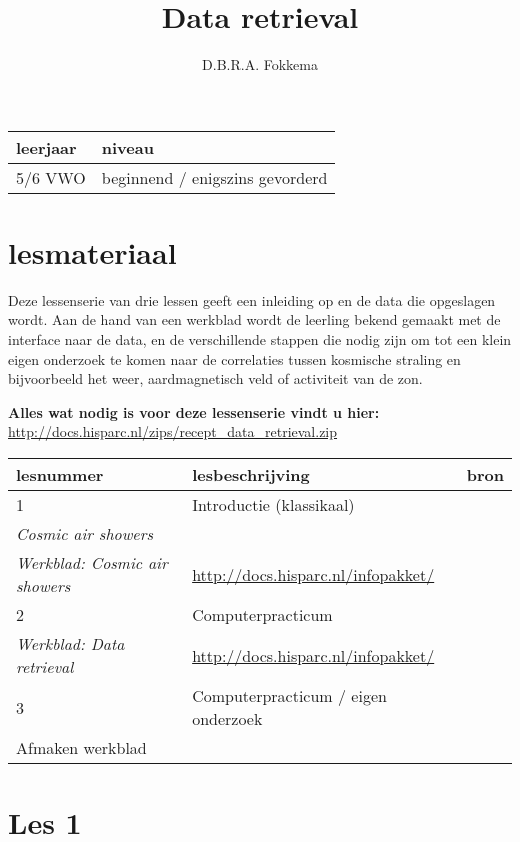 

\title{Data retrieval}
\author{D.B.R.A. Fokkema}



\maketitle

\begin{tabular}{|>{\raggedright}p{3cm}|>{\raggedright}p{12cm}|}
\hline
leerjaar & niveau \tabularnewline
\hline
5/6 VWO & beginnend / enigszins gevorderd \tabularnewline
\hline
\end{tabular}


\section{lesmateriaal}

Deze lessenserie van drie lessen geeft een inleiding op \hisparc en de
data die opgeslagen wordt. Aan de hand van een werkblad wordt de leerling
bekend gemaakt met de interface naar de \hisparc data, en de verschillende
stappen die nodig zijn om tot een klein eigen onderzoek te komen naar de
correlaties tussen kosmische straling en bijvoorbeeld het weer,
aardmagnetisch veld of activiteit van de zon.

\textbf{Alles wat nodig is voor deze lessenserie vindt u hier:}
\url{http://docs.hisparc.nl/zips/recept_data_retrieval.zip}

\begin{tabular}{ |>{\raggedright}p{2.5cm}|>{\raggedright}p{8cm}|>{\raggedright}p{4cm}|}
\hline
lesnummer & lesbeschrijving & bron \tabularnewline
\hline
1 & Introductie (klassikaal) \\
\emph{Cosmic air showers} \\
\emph{Werkblad: Cosmic air showers}
& \url{http://docs.hisparc.nl/infopakket/} \tabularnewline
\hline
2 & Computerpracticum \\
\emph{Werkblad: Data retrieval}
& \url{http://docs.hisparc.nl/infopakket/} \tabularnewline
\hline
3 & Computerpracticum / eigen onderzoek \\
Afmaken werkblad
& \tabularnewline
\hline
\end{tabular}


\section{Les 1}

